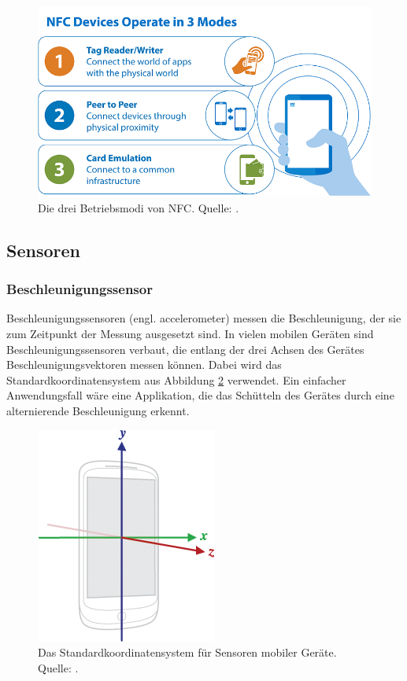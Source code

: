 \begin{figure}
\begin{center}
\includegraphics[scale=1.5]{bilder/nfc_modes.png}
\end{center}
\caption{Die drei Betriebsmodi von NFC. Quelle: \citep{NFCWhat}.}
\label{fig:nfc_modes}
\end{figure}

\subsection{Sensoren}
\label{subsec:sensors}

\subsubsection{Beschleunigungssensor}
\label{subsec:accelerometer}
Beschleunigungssensoren (engl. accelerometer) messen die Beschleunigung, der sie zum Zeitpunkt der Messung ausgesetzt sind. In vielen mobilen Geräten sind Beschleunigungssensoren verbaut, die entlang der drei Achsen des Gerätes Beschleunigungsvektoren messen können. Dabei wird das Standardkoordinatensystem aus Abbildung \ref{fig:coordinate_system} verwendet. Ein einfacher Anwendungsfall wäre \zb eine Applikation, die das Schütteln des Gerätes durch eine alternierende Beschleunigung erkennt.

\begin{figure}[ht]
\centering
\includegraphics[scale=0.65]{bilder/coordinate_system.png}
\caption{Das Standardkoordinatensystem für Sensoren mobiler Geräte. Quelle: \citep{AndroidSensors}.}
\label{fig:coordinate_system}
\end{figure}

